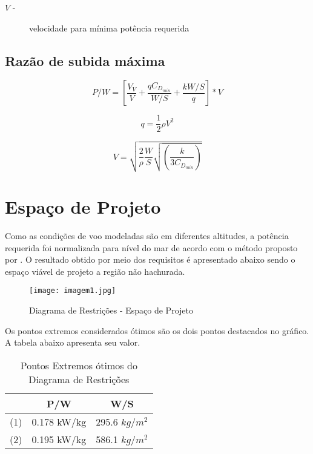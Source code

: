 \begin{description}
 \item[$V$  -]velocidade para mínima potência requerida 
\end{description}

\subsection{Razão de subida máxima}

\begin{equation}
P/W = \left[ \frac{V_V}{V} + \frac{q C_{D_{min}}}{W/S} +  \frac{k W/S}{q} \right] * V  
\end{equation}

\begin{equation}
q = \frac{1}{2} \rho V^2
\end{equation}

\begin{equation}
V = \sqrt{ \frac{2}{\rho} \frac{W}{S} \sqrt{ \left( \frac{k}{3 C_{D_{min}}}\right)} }
\end{equation}

\section{Espaço de Projeto}

Como as condições de voo modeladas são em diferentes altitudes, a potência requerida foi normalizada para nível do mar de acordo com o método proposto por \cite{anderson1999aircraft}.
O resultado obtido por meio dos requisitos é apresentado abaixo sendo o espaço viável de projeto a região não hachurada.

\begin{figure}[H]
\centering
\texttt{[image: imagem1.jpg]}
\caption[Diagrama de Restrições]{Diagrama de Restrições - Espaço de Projeto}
\label{fig:diagr_restri}
\end{figure}

Os pontos extremos considerados ótimos são os dois pontos destacados no gráfico.
A tabela abaixo apresenta seu valor.

\begin{table}[H]
\centering
\begin{tabular}{ccc}
\toprule
 & P/W & W/S \\ \midrule
(1) & 0.178 kW/kg & 295.6 $kg/m^2$ \\
(2) & 0.195 kW/kg & 586.1 $kg/m^2$ \\
\bottomrule
\end{tabular}
\caption[Pontos Extremos ótimos do Diagrama de Restrições]{Pontos Extremos ótimos do Diagrama de Restrições}
\label{tbl:pontos_extremos}
\end{table}

